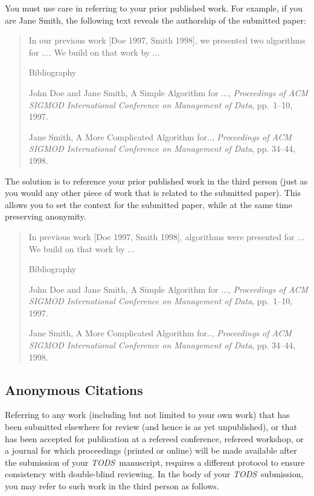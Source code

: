 \documentclass[acmtods,acmnow]{acmtrans2m}
\newcommand{\tods}{{\em TODS\/}}
\begin{document}
You must use care in referring to your prior published work. For
example, if you are Jane Smith, the following text reveals the authorship
of the submitted paper:

\pagebreak

\begin{quotation}
In our previous work [Doe 1997, Smith 1998], we presented two algorithms for .... We build on that work by ...

{\sffamily Bibliography}

{\sc John Doe and Jane Smith}, A Simple Algorithm for ..., {\em Proceedings of ACM
SIGMOD International Conference on Management of Data}, pp.~1--10, 1997. 

{\sc Jane Smith}, A More Complicated Algorithm for.., {\em Proceedings of ACM
SIGMOD International Conference on Management of Data}, pp. 34--44, 1998.
\end{quotation}

\noindent
The solution is to reference your prior published work in the third person
(just as you would any other piece of work that is related to the submitted
paper). This allows you to set the context for the submitted paper, while at
the same time preserving anonymity.

\begin{quotation}
In previous work [Doe 1997, Smith 1998], algorithms were presented for ... We
build on that work by ...

{\sffamily Bibliography}

{\sc John Doe and Jane Smith}, A Simple Algorithm for ..., {\em Proceedings of ACM
SIGMOD  International Conference on Management of Data}, pp.~1--10, 1997.

{\sc Jane Smith}, A More Complicated Algorithm for.., {\em Proceedings of ACM
SIGMOD  International Conference on Management of Data}, pp. 34--44, 1998.
\end{quotation}

\subsection{Anonymous Citations}\label{app:anoncit}
Referring to any work (including but not limited to your own work) that has
been submitted elsewhere for review (and hence is as yet unpublished), or
that has been accepted for publication at a refereed conference, refereed
workshop, or a journal for which proceedings (printed or online) will be
made available after the submission of your \tods\ manuscript, requires a
different protocol to ensure consistency with double-blind reviewing. In the
body of your \tods\ submission, you may refer to such work in the third
person as follows.
\end{document}
